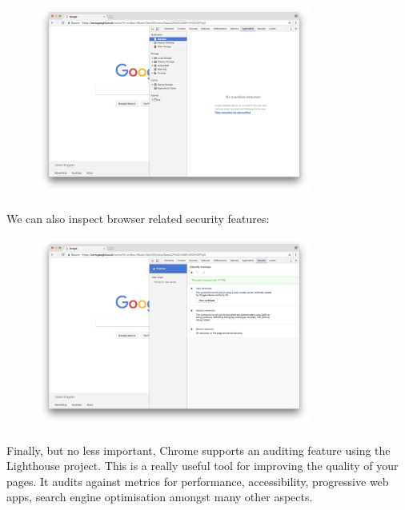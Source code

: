 \documentclass[12pt, a4paper, oneside]{book}
\begin{document}
\begin{figure}[H]
\centering
\includegraphics[width=0.8\textwidth]{figures/devtools-application.png}
\label{fig:devtools-application}
\end{figure}


\paragraph{} We can also inspect browser related security features:

\begin{figure}[H]
\centering
\includegraphics[width=0.8\textwidth]{figures/devtools-security.png}
\label{fig:devtools-security}
\end{figure}

\paragraph{} Finally, but no less important, Chrome supports an auditing feature using the Lighthouse project. This is a really useful tool for improving the quality of your pages. It audits against metrics for performance, accessibility, progressive web apps, search engine optimisation amongst many other aspects.
\end{document}
